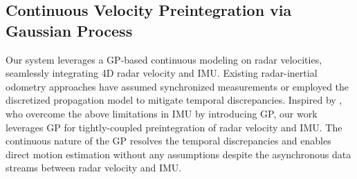 \subsection{Continuous Velocity Preintegration via Gaussian Process}
\label{subsec:velocity integration}

Our system leverages a \ac{GP}-based continuous modeling on radar velocities, seamlessly integrating 4D radar velocity and \ac{IMU}.
Existing radar-inertial odometry approaches have assumed synchronized measurements \cite{DoerENC2020} or employed the discretized propagation model \cite{zhuang20234d} to mitigate temporal discrepancies.
Inspired by \citet{le2021continuous}, who overcome the above limitations in \ac{IMU} by introducing \ac{GP}, our work leverages \ac{GP} for tightly-coupled preintegration of radar velocity and \ac{IMU}. The continuous nature of the \ac{GP} resolves the temporal discrepancies and enables direct motion estimation without any assumptions despite the asynchronous data streams between radar velocity and \ac{IMU}.


